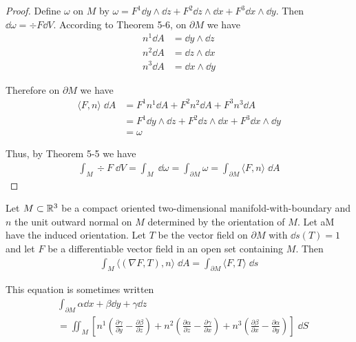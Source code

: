 \begin{proof}
    Define $\omega$ on $M$ by $\omega=F^1\dd y\wedge\dd z + F^2\dd z\wedge\dd x + F^3\dd x\wedge\dd y$.
    Then $\dd\omega = \div F\dd V$. According to Theorem 5-6, on $\partial M$ we have 
    \begin{align*}
        n^1\dd A & = \dd y\wedge \dd z\\
        n^2\dd A & = \dd z\wedge \dd x\\
        n^3\dd A & = \dd x\wedge \dd y
    \end{align*}

    Therefore on $\partial M$ we have 
    \begin{align*}
        \langle F,n\rangle\;\dd A 
        & = F^1n^1\dd A + F^2n^2\dd A + F^3n^3\dd A \\
        & = F^1\dd y\wedge \dd z + F^2\dd z\wedge \dd x + F^3\dd x\wedge \dd y \\
        & = \omega
    \end{align*}

    Thus, by Theorem 5-5 we have
    \begin{align*}
        \int_M\div F\;\dd V
        = \int_M\;\dd\omega
        = \int_{\partial M}\omega
        = \int_{\partial M}\langle F,n\rangle\;\dd A
    \end{align*}
\end{proof}

\begin{theorem}
    Let $M\subset\mathbb{R}^3$ be a compact oriented two-dimensional manifold-with-boundary and $n$ the
    unit outward normal on $M$ determined by the orientation of $M$. Let aM have the induced orientation.
    Let $T$ be the vector field on $\partial M$ with $\dd s(T) = 1$ and let $F$ be a differentiable 
    vector field in an open set containing $M$. Then
    \begin{align*}
        \int_{M}\langle (\nabla F,T), n\rangle\;\dd A = \int_{\partial M}\langle F,T\rangle\;\dd s
    \end{align*}

    This equation is sometimes written
    \begin{align*}
        & \int_{\partial M}\alpha \dd x+\beta\dd y+\gamma\dd z \\
        & = \iint_{M}\left[
            n^1\left(\frac{\partial\gamma}{\partial y}-\frac{\partial\beta}{\partial z}\right)
            + n^2\left(\frac{\partial\alpha}{\partial z}-\frac{\partial\gamma}{\partial x}\right)
            + n^3\left(\frac{\partial\beta}{\partial x}-\frac{\partial\alpha}{\partial y}\right)
            \right]\;\dd S
    \end{align*}
\end{theorem}

